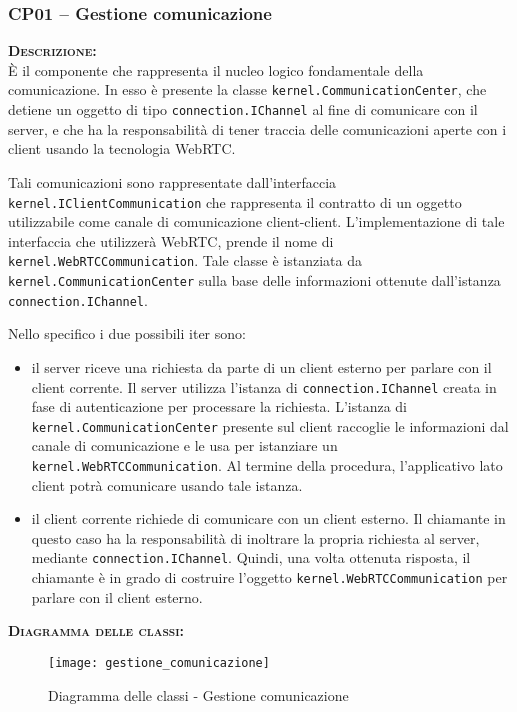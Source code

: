\subsubsection{CP01 -- Gestione comunicazione}

\begin{description}
	\item{\scshape\bfseries Descrizione:}\\
È il componente che rappresenta il nucleo logico fondamentale della comunicazione. In esso è presente la classe \texttt{kernel.CommunicationCenter}, che detiene un oggetto di tipo \texttt{connection.IChannel} al fine di comunicare con il server, e che ha la responsabilità di tener traccia delle comunicazioni aperte con i client usando la tecnologia WebRTC\@.

Tali comunicazioni sono rappresentate dall'interfaccia \texttt{kernel.IClientCommunication} che rappresenta il contratto di un oggetto utilizzabile come canale di comunicazione client-client. L'implementazione di tale interfaccia che utilizzerà WebRTC, prende il nome di \texttt{kernel.WebRTCCommunication}. Tale classe è istanziata da \texttt{kernel.CommunicationCenter} sulla base delle informazioni ottenute dall'istanza \texttt{connection.IChannel}. 

Nello specifico i due possibili iter sono:
\begin{itemize}
	\item il server riceve una richiesta da parte di un client esterno per parlare con il client corrente. Il server utilizza l'istanza di \texttt{connection.IChannel} creata in fase di autenticazione per processare la richiesta. L'istanza di \texttt{kernel.CommunicationCenter} presente sul client raccoglie le informazioni dal canale di comunicazione e le usa per istanziare un \texttt{kernel.WebRTCCommunication}. Al termine della procedura, l'applicativo lato client potrà comunicare usando tale istanza.
	\item il client corrente richiede di comunicare con un client esterno. Il chiamante in questo caso ha la responsabilità di inoltrare la propria richiesta al server, mediante \texttt{connection.IChannel}. Quindi, una volta ottenuta risposta, il chiamante è in grado di costruire l'oggetto \texttt{kernel.WebRTCCommunication} per parlare con il client esterno.
\end{itemize}

	\item{\scshape\bfseries Diagramma delle classi:}
  \begin{figure}[H]
    \centering
    \texttt{[image: gestione\_comunicazione]}
    \caption{Diagramma delle classi - Gestione comunicazione}\label{fig:gestionecomunicazione}
  \end{figure}


\end{description}
